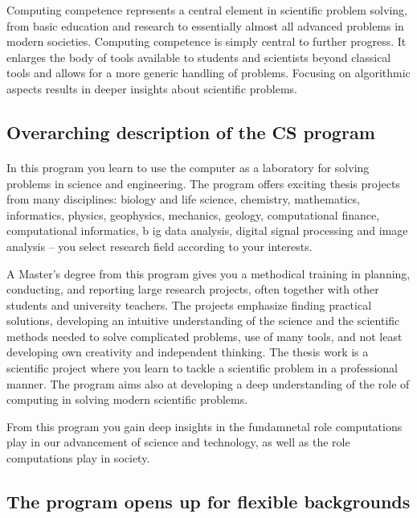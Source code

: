 \documentclass[%
oneside,                 %
final,                   %
10pt]{article}
\begin{document}
Computing competence represents a central element
in scientific problem solving, from basic education and research to
essentially almost all advanced problems in modern
societies. Computing competence is simply central to further
progress. It enlarges the body of tools available to students and
scientists beyond classical tools and allows for a more generic
handling of problems. Focusing on algorithmic aspects results in
deeper insights about scientific problems.



\subsection{Overarching description of the CS program}

\paragraph{}
In this program you learn to use the computer as a laboratory for
solving problems in science and engineering. The program offers
exciting thesis projects from many disciplines: biology and life
science, chemistry, mathematics, informatics, physics, geophysics,
mechanics, geology, computational finance, computational informatics, b
ig data analysis, digital signal processing
and image analysis – you select research field according to
your interests.

A Master’s degree from this program gives you a methodical
training in planning, conducting, and reporting large research
projects, often together with other students and university teachers.
The projects emphasize finding practical solutions, developing an
intuitive understanding of the science and the scientific methods
needed to solve complicated problems, use of many tools, and not least
developing own creativity and independent thinking. The thesis
work is a scientific project where you learn to tackle a
scientific problem in a professional manner.   The program aims also at
developing a deep understanding of the role of computing in solving modern scientific
problems. 

From this program you gain  deep insights in the fundamnetal role
computations play  in our advancement of science and technology, as well as the role computations play  in society.



\subsection{The program opens up for flexible backgrounds}
\end{document}

